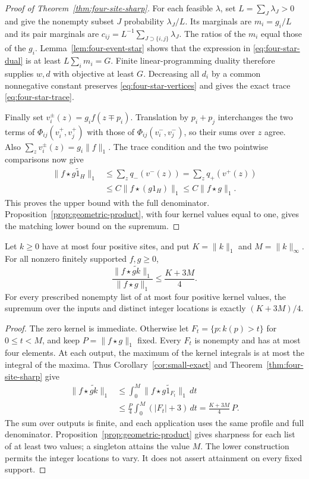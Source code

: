 \begin{proof}[Proof of Theorem~\ref{thm:four-site-sharp}]
For each feasible $\lambda$, set $L=\sum_J\lambda_J>0$ and give the
nonempty subset $J$ probability $\lambda_J/L$. Its marginals are
$m_i=g_i/L$ and its pair marginals are
$c_{ij}=L^{-1}\sum_{J\supset\{i,j\}}\lambda_J$.
The ratios of the $m_i$ equal those of the $g_i$.
Lemma~\ref{lem:four-event-star} shows that the expression in
\eqref{eq:four-star-dual} is at least
$L\sum_i m_i=G$. Finite linear-programming duality therefore supplies
$w,d$ with objective at least $G$. Decreasing all $d_i$ by a common
nonnegative constant preserves \eqref{eq:four-star-vertices} and
gives the exact trace \eqref{eq:four-star-trace}.

Finally set $v_i^\pm(z)=g_i f(z\mp p_i)$.
Translation by $p_i+p_j$ interchanges the two terms of
$\Phi_{ij}(v_i^+,v_j^+)$ with those of
$\Phi_{ij}(v_i^-,v_j^-)$, so their sums over $z$ agree.
Also $\sum_zv_i^\pm(z)=g_i\|f\|_1$.
The trace condition and the two pointwise comparisons now give
\[
 \begin{aligned}
 \|f\star\widetilde{g1_H}\|_1
 &\le\sum_zq_-(v^-(z))
  =\sum_zq_+(v^+(z))\\
 &\le C\|f\star(g1_H)\|_1
 \le C\|f\star g\|_1.
 \end{aligned}
\]
This proves the upper bound with the full denominator.
Proposition~\ref{prop:geometric-product}, with four kernel values
equal to one, gives the matching lower bound on the supremum.
\end{proof}

\begin{corollary}
\label{cor:four-site-weighted}
Let $k\ge0$ have at most four positive sites, and put
$K=\|k\|_1$ and $M=\|k\|_\infty$. For all nonzero finitely supported
$f,g\ge0$,
\begin{equation}\label{eq:four-site-weighted}
 \frac{\|f\star\widetilde{gk}\|_1}{\|f\star g\|_1}
 \le\frac{K+3M}{4}.
\end{equation}
For every prescribed nonempty list of at most four positive kernel
values, the supremum over the inputs and distinct integer locations
is exactly $(K+3M)/4$.
\end{corollary}
\begin{proof}
The zero kernel is immediate. Otherwise let
$F_t=\{p:k(p)>t\}$ for $0\le t<M$, and keep
$P=\|f\star g\|_1$ fixed. Every $F_t$ is nonempty and has at most
four elements. At each output, the maximum of the kernel integrals
is at most the integral of the maxima. Thus
Corollary~\ref{cor:small-exact} and
Theorem~\ref{thm:four-site-sharp} give
\[
 \begin{aligned}
 \|f\star\widetilde{gk}\|_1
 &\le\int_0^M\|f\star\widetilde{g1_{F_t}}\|_1\,dt\\
 &\le\frac P4\int_0^M(|F_t|+3)\,dt
  =\frac{K+3M}{4}\,P.
 \end{aligned}
\]
The sum over outputs is finite, and each application uses the same
profile and full denominator. Proposition~\ref{prop:geometric-product}
gives sharpness for each list of at least two values; a singleton
attains the value $M$. The lower construction permits the integer
locations to vary. It does not assert attainment on every fixed support.
\end{proof}
